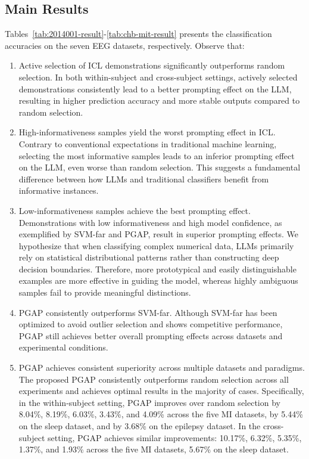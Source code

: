 \documentclass[journal,twocolumn]{IEEEtran}
\begin{document}
\subsection{Main Results}
Tables~\ref{tab:2014001-result}-\ref{tab:chb-mit-result} presents the classification accuracies on the seven EEG datasets, respectively. Observe that:
\begin{enumerate}
  \item {Active selection of ICL demonstrations significantly outperforms random selection.} In both within-subject and cross-subject settings, actively selected demonstrations consistently lead to a better prompting effect on the LLM, resulting in higher prediction accuracy and more stable outputs compared to random selection.
  \item {High-informativeness samples yield the worst prompting effect in ICL.} Contrary to conventional expectations in traditional machine learning, selecting the most informative samples leads to an inferior prompting effect on the LLM, even worse than random selection. This suggests a fundamental difference between how LLMs and traditional classifiers benefit from informative instances.
  \item {Low-informativeness samples achieve the best prompting effect.} Demonstrations with low informativeness and high model confidence, as exemplified by SVM-far and PGAP, result in superior prompting effects. We hypothesize that when classifying complex numerical data, LLMs primarily rely on statistical distributional patterns rather than constructing deep decision boundaries. Therefore, more prototypical and easily distinguishable examples are more effective in guiding the model, whereas highly ambiguous samples fail to provide meaningful distinctions.
  \item {PGAP consistently outperforms SVM-far.} Although SVM-far has been optimized to avoid outlier selection and shows competitive performance, PGAP still achieves better overall prompting effects across datasets and experimental conditions.
  \item {PGAP achieves consistent superiority across multiple datasets and paradigms.} The proposed PGAP consistently outperforms random selection across all experiments and achieves optimal results in the majority of cases. Specifically, in the within-subject setting, PGAP improves over random selection by 8.04\%, 8.19\%, 6.03\%, 3.43\%, and 4.09\% across the five MI datasets, by 5.44\% on the sleep dataset, and by 3.68\% on the epilepsy dataset. In the cross-subject setting, PGAP achieves similar improvements: 10.17\%, 6.32\%, 5.35\%, 1.37\%, and 1.93\% across the five MI datasets, 5.67\% on the sleep dataset.

\end{enumerate}
\end{document}
